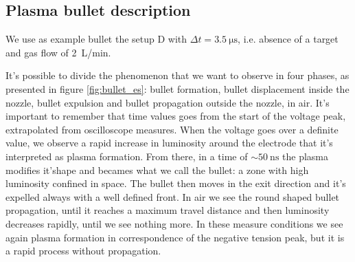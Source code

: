 \subsection{Plasma bullet description}
We use as example bullet the setup D with $\Delta t = \SI{3.5}{\micro\second}$, i.e. absence of a target and gas flow of \SI{2}{\liter/\minute}.


It's possible to divide the phenomenon that we want to observe in four phases, as presented in figure \ref{fig:bullet_es}: bullet formation, bullet displacement inside the nozzle, bullet expulsion and bullet propagation outside the nozzle, in air. It's important to remember that time values goes from the start of the voltage peak, extrapolated from oscilloscope measures.
When the voltage goes over a definite value, we observe a rapid increase in luminosity around the electrode that it's interpreted as plasma formation. From there, in a time of $\sim \SI{50}{\nano\second}$ the plasma modifies it'shape and becames what we call the bullet: a zone with high luminosity confined in space. The bullet then moves in the exit direction and it's expelled always with a well defined front. In air we see the round shaped bullet propagation, until it reaches a maximum travel distance and then luminosity decreases rapidly, until we see nothing more. In these measure conditions we see again plasma formation in correspondence of the negative tension peak, but it is  a rapid process without propagation.
